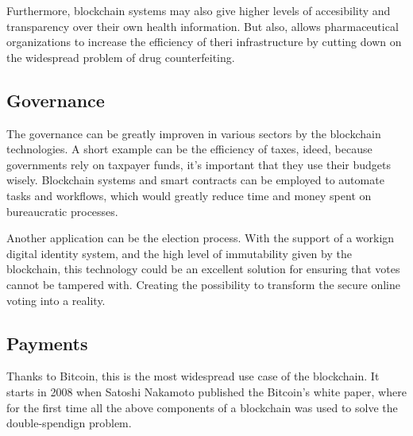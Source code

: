 Furthermore, blockchain systems may also give higher levels of accesibility and 
transparency over their own health information. But also, allows pharmaceutical 
organizations to increase the efficiency of theri infrastructure by cutting 
down on the widespread problem of drug counterfeiting.\cite{binancevision}

\subsection{Governance}
\label{sec:governance}

The governance can be greatly improven in various sectors by the blockchain technologies.
A short example can be the efficiency of taxes, ideed, because governments rely on 
taxpayer funds, it's important that they use their budgets wisely. Blockchain systems 
and smart contracts can be employed to automate tasks and workflows, which would 
greatly reduce time and money spent on bureaucratic processes.\cite{binancevision}

Another application can be the election process. With the support of a workign digital 
identity system, and the high level of immutability given by the blockchain, this 
technology could be an excellent solution for ensuring that votes cannot be tampered with.
Creating the possibility to transform the secure online voting into a reality. 

\subsection{Payments}
\label{sec:payments}

Thanks to Bitcoin, this is the most widespread use case of the blockchain. It starts in 
2008 when Satoshi Nakamoto published the Bitcoin's white paper, where for the first time 
all the above components of a blockchain was used to solve the double-spendign problem.\pagebreak


